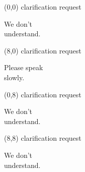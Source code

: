 \documentclass[a4paper,extrafontsizes,20pt]{memoir}
\newcommand{\mycard}[3]{%
	\miniscule #1 #2
	\hspace*{-5cm}
	\begin{minipage}[t][14.6cm][c]{9.5cm}%
	\begin{sidewaystable}
	\hspace*{4.0cm}
	\begin{center}
		\HUGE #3
	\end{center}
	\end{sidewaystable}
	\end{minipage}
}
\begin{document}
\begin{textblock}{8}(0,0)
\mycard{1}{clarification request}{
We don't \\
understand.\\
}
\end{textblock}

\begin{textblock}{8}(8,0)
\mycard{1}{clarification request}{
Please speak\\
slowly.
}
\end{textblock}

\begin{textblock}{8}(0,8)
\mycard{1}{clarification request}{
We don't \\understand.
}
\end{textblock}

\begin{textblock}{8}(8,8)
\mycard{1}{clarification request}{
We don't \\understand.
}
\end{textblock}

\null
\newpage
\end{document}
